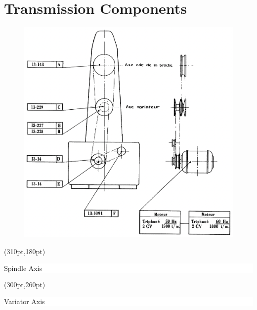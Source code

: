 \chapter{Transmission Components}

\begin{figure}[ht]
    \centering
    \includegraphics[width=0.9\linewidth]{images/page_60_transmission_components}
    \label{fig:transmission_components}
\end{figure}



\begin{textblock*}{2cm}(310pt,180pt)
    \colorbox{white}{\parbox{\linewidth}{\small Spindle Axis}\vspace{2pt}}
\end{textblock*}%



\begin{textblock*}{2.5cm}(300pt,260pt)
    \colorbox{white}{\parbox{\linewidth}{\small Variator Axis}\vspace{2pt}}
\end{textblock*}%

\newcommand{\transmission}[4][.5]{%
    \def\coverXPosition{\numexpr #2 - 3\relax}
    \def\coverYPosition{\numexpr #3 - 4\relax}
    \cover {\coverXPosition}{\coverYPosition}{2.5}{#1}

    {\small
        \begin{textblock*}{4cm}(#2pt,#3pt) %
            \begin{tabular}{|p{1.5cm}|c|}
                \hline
                #4
                \hline
            \end{tabular}
        \end{textblock*}
    }%
}

